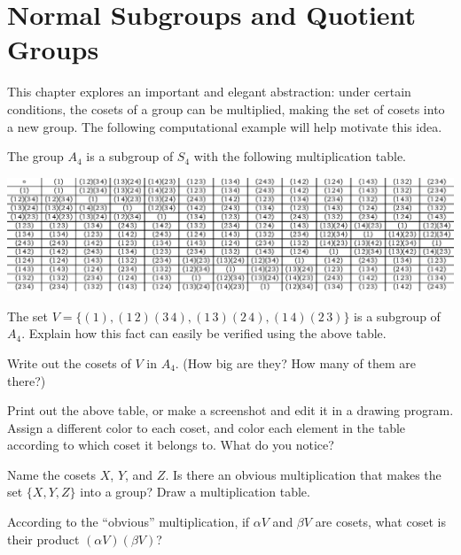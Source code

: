 \chapter{Normal Subgroups and Quotient Groups}\label{chap:quotientgps}

This chapter explores an important and elegant abstraction: under certain conditions, the cosets of a group can be multiplied, making the set of cosets into a new group. The following computational example will help motivate this idea.
\begin{annotation}
\end{annotation}

\begin{problem}\label{prob:a4comp}
The group \(A_4\)  is a subgroup of \(S_4\) with the following multiplication table.
\begin{center}
\includegraphics[width=\textwidth]{a4.eps}
\end{center}
\begin{problemparts}
  \item The set \(V=\{(1),(1\,2)(3\,4), (1\,3)(2\,4) , (1\,4)(2\,3)\} \) is a subgroup of \(A_4\). Explain how this fact can easily be verified using the above table.
  \item Write out the cosets of \(V\) in \(A_4\). (How big are they? How many of them are there?)
  \item Print out the above table, or make a screenshot and edit it in a drawing program. Assign a different color to each coset, and color each element in the table according to which coset it belongs to. What do you notice?
  \item Name the cosets \(X\), \(Y\), and \(Z\). Is there an obvious multiplication that makes the set \(\{X,Y,Z\}\) into a group? Draw a multiplication table.
  \item According to the ``obvious'' multiplication, if \(\alpha V\) and \(\beta V\) are cosets, what coset is their product \((\alpha V)(\beta V)\)?
\end{problemparts}
\end{problem}

